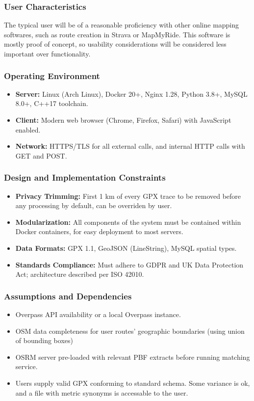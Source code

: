 \documentclass[11pt,twoside]{report}
\begin{document}
\subsubsection{User Characteristics}
The typical user will be of a reasonable proficiency with other online mapping softwares, such as route
creation in Strava or MapMyRide. This software is mostly proof of concept, so usability considerations will
be considered less important over functionality.

\subsubsection{Operating Environment}
\begin{itemize}
	\item \textbf{Server:} Linux (Arch Linux), Docker 20+, Nginx 1.28, Python 3.8+, MySQL 8.0+, C++17 toolchain.
	\item \textbf{Client:} Modern web browser (Chrome, Firefox, Safari) with JavaScript enabled.
	\item \textbf{Network:} HTTPS/TLS for all external calls, and internal HTTP calls with GET and POST.
\end{itemize}

\subsubsection{Design and Implementation Constraints}
\label{sec:constraints}
\begin{itemize}
	\item \textbf{Privacy Trimming:} First 1 km of every GPX trace to be removed before any processing by default, can be overriden by user.
	\item \textbf{Modularization:} All components of the system must be contained within Docker containers, for easy deployment to most servers.
	\item \textbf{Data Formats:} GPX 1.1, GeoJSON (LineString), MySQL spatial types.
	\item \textbf{Standards Compliance:} Must adhere to GDPR and UK Data Protection Act; architecture described per ISO 42010.
\end{itemize}
\subsubsection{Assumptions and Dependencies}
\begin{itemize}
	\item Overpass API availability or a local Overpass instance.
	\item OSM data completeness for user routes’ geographic boundaries (using union of bounding boxes)
	\item OSRM server pre-loaded with relevant PBF extracts before running matching service.
	\item Users supply valid GPX conforming to standard schema. Some variance is ok, and a file with metric synonyms is accessable to the user.
\end{itemize}
\end{document}
